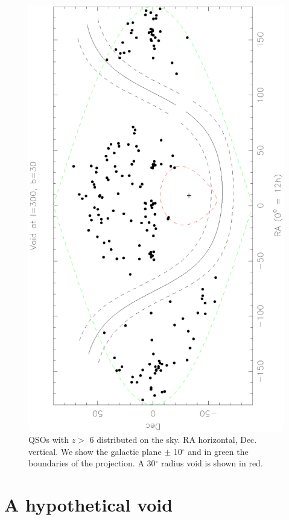 \documentclass[]{pasa}
\begin{document}
 
 \begin{figure}
\includegraphics[scale=0.7, angle=-90]{qso2}  
\caption{\label{fig:qso}
QSOs with $z >$ 6 distributed on the sky. RA horizontal, Dec. vertical. We show the galactic plane $\pm$ 10$^\circ$ and in green the boundaries of the projection. A 30$^\circ$ radius void is shown in red.}
\end{figure}



\section{A hypothetical void}\label{sec:tau}
\end{document}
